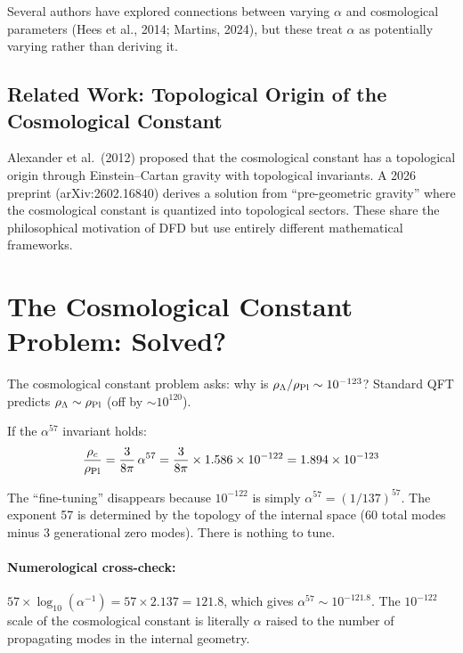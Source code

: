 \documentclass[11pt]{article}
\begin{document}
Several authors have explored connections between varying $\alpha$ and
cosmological parameters (Hees et al., 2014; Martins, 2024), but these
treat $\alpha$ as potentially varying rather than deriving it.

\subsection{Related Work: Topological Origin of the Cosmological Constant}

Alexander et al.\ (2012) proposed that the cosmological constant has a
topological origin through Einstein--Cartan gravity with topological invariants.
A 2026 preprint (arXiv:2602.16840) derives a solution from ``pre-geometric
gravity'' where the cosmological constant is quantized into topological sectors.
These share the philosophical motivation of DFD but use entirely different
mathematical frameworks.

\section{The Cosmological Constant Problem: Solved?}
\label{sec:CC}

The cosmological constant problem asks: why is
$\rho_\Lambda/\rho_{\rm Pl} \sim 10^{-123}$? Standard QFT predicts
$\rho_\Lambda \sim \rho_{\rm Pl}$ (off by $\sim 10^{120}$).

If the $\alpha^{57}$ invariant holds:
\begin{equation}
\frac{\rho_c}{\rho_{\rm Pl}} = \frac{3}{8\pi}\,\alpha^{57}
= \frac{3}{8\pi} \times 1.586 \times 10^{-122}
= 1.894 \times 10^{-123}
\end{equation}

The ``fine-tuning'' disappears because $10^{-122}$ is simply
$\alpha^{57} = (1/137)^{57}$. The exponent 57 is determined by
the topology of the internal space (60 total modes minus 3 generational
zero modes). There is nothing to tune.

\paragraph{Numerological cross-check:}
$57 \times \log_{10}(\alpha^{-1}) = 57 \times 2.137 = 121.8$, which
gives $\alpha^{57} \sim 10^{-121.8}$. The $10^{-122}$ scale of the
cosmological constant is literally $\alpha$ raised to the number of
propagating modes in the internal geometry.
\end{document}
